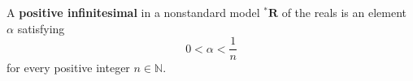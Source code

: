 A \textbf{positive infinitesimal} in a nonstandard model ${^*\mathbf{R}}$ of the reals is an element $\alpha$ satisfying
$$0 < \alpha < \frac{1}{n}$$
for every positive integer $n \in \mathbb{N}$.
